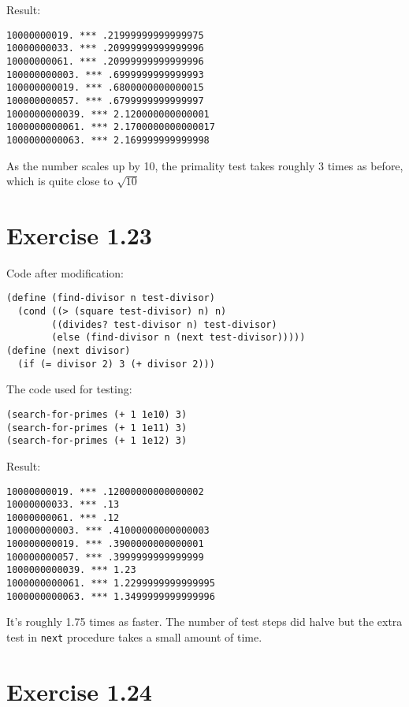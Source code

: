\documentclass[../main.tex]{subfiles}
\begin{document}
Result:

\begin{lstlisting}
10000000019. *** .21999999999999975
10000000033. *** .20999999999999996
10000000061. *** .20999999999999996
100000000003. *** .6999999999999993
100000000019. *** .6800000000000015
100000000057. *** .6799999999999997
1000000000039. *** 2.120000000000001
1000000000061. *** 2.1700000000000017
1000000000063. *** 2.169999999999998
\end{lstlisting}

As the number scales up by 10, the primality
 test takes roughly 3 times as before, which is
 quite close to $\sqrt{10}$

\section{Exercise 1.23}

Code after modification:

\begin{lstlisting}
(define (find-divisor n test-divisor)
  (cond ((> (square test-divisor) n) n)
        ((divides? test-divisor n) test-divisor)
        (else (find-divisor n (next test-divisor)))))
(define (next divisor)
  (if (= divisor 2) 3 (+ divisor 2)))
\end{lstlisting}

The code used for testing:

\begin{lstlisting}
(search-for-primes (+ 1 1e10) 3)
(search-for-primes (+ 1 1e11) 3)
(search-for-primes (+ 1 1e12) 3)
\end{lstlisting}

Result:

\begin{lstlisting}
10000000019. *** .12000000000000002
10000000033. *** .13
10000000061. *** .12
100000000003. *** .41000000000000003
100000000019. *** .3900000000000001
100000000057. *** .3999999999999999
1000000000039. *** 1.23
1000000000061. *** 1.2299999999999995
1000000000063. *** 1.3499999999999996
\end{lstlisting}

It's roughly 1.75 times as faster. The number of test steps
 did halve but the extra test in \lstinline{next} procedure
 takes a small amount of time.

\section{Exercise 1.24}
\end{document}
